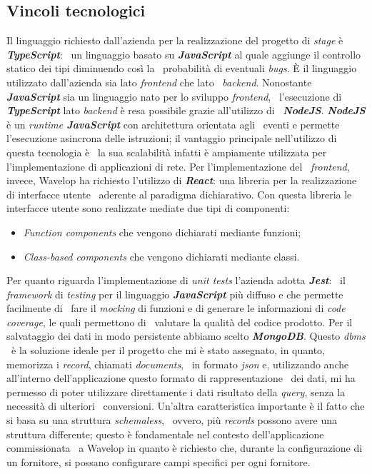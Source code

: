 \subsection{Vincoli tecnologici}
Il linguaggio richiesto dall'azienda per la realizzazione del progetto di \emph{stage} è \emph{\textbf{TypeScript}}: \
un linguaggio basato su \emph{\textbf{JavaScript}} al quale aggiunge il controllo statico dei tipi diminuendo così la \
probabilità di eventuali \emph{bugs}. È il linguaggio utilizzato dall'azienda sia lato \emph{\gls{frontend}} che lato \
\emph{\gls{backend}}. Nonostante \emph{\textbf{JavaScript}} sia un linguaggio nato per lo sviluppo \emph{frontend}, \
l'esecuzione di \emph{\textbf{TypeScript}} lato \emph{backend} è resa possibile grazie all'utilizzo di \
\emph{\textbf{NodeJS}}. \emph{\textbf{NodeJS}} è un \emph{runtime \textbf{JavaScript}} con architettura orientata agli \
eventi e permette l'esecuzione asincrona delle istruzioni; il vantaggio principale nell'utilizzo di questa tecnologia è \
la sua scalabilità infatti è ampiamente utilizzata per l'implementazione di applicazioni di rete. Per l'implementazione del \
\emph{frontend}, invece, Wavelop ha richiesto l'utilizzo di \emph{\textbf{React}}: una libreria per la realizzazione di interfacce utente \
aderente al paradigma dichiarativo. Con questa libreria le interfacce utente sono realizzate mediate due tipi di componenti: \
\begin{itemize}
  \item \emph{Function components} che vengono dichiarati mediante funzioni;
  \item \emph{Class-based components} che vengono dichiarati mediante classi.
\end{itemize}
Per quanto riguarda l'implementazione di \emph{unit tests} l'azienda adotta \emph{\textbf{Jest}}: \
il \emph{framework} di \emph{testing} per il linguaggio \emph{\textbf{JavaScript}} più diffuso e che permette facilmente di \
fare il \emph{mocking} di funzioni e di generare le informazioni di \emph{code coverage}, le quali permettono di \
valutare la qualità del codice prodotto.
Per il salvataggio dei dati in modo persistente abbiamo scelto \emph{\textbf{MongoDB}}. Questo \emph{\acrshort{dbms}} \
è la soluzione ideale per il progetto che mi è stato assegnato, in quanto, memorizza i \emph{record}, chiamati \emph{documents}, \
in formato \emph{\acrshort{json}} e, utilizzando anche all'interno dell'applicazione questo formato di rappresentazione \
dei dati, mi ha permesso di poter utilizzare direttamente i dati risultato della \emph{query}, senza la necessità di ulteriori \
conversioni. Un'altra caratteristica importante è il fatto che si basa su una struttura \emph{schemaless}, \
ovvero, più \emph{records} possono avere una struttura differente; questo è fondamentale nel contesto dell'applicazione commissionata \
a Wavelop in quanto è richiesto che, durante la configurazione di un fornitore, si possano configurare campi specifici per ogni fornitore.

